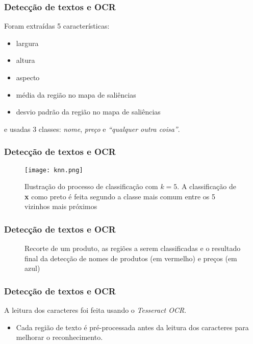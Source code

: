 \documentclass{beamer}
\begin{document}
\begin{frame}
\frametitle{Detecção de textos e OCR}
        
    Foram extraídas 5 características:\pause
    \begin{itemize}
        \item largura\pause
        \item altura\pause
        \item aspecto\pause
        \item média da região no mapa de saliências\pause
        \item desvio padrão da região no mapa de saliências
    \end{itemize}\pause
     e usadas 3 classes: \emph{nome}, \emph{preço} e \emph{``qualquer outra coisa''}.
\end{frame}

\begin{frame}
\frametitle{Detecção de textos e OCR}
\begin{figure}[h!]
    \begin{center}
        \texttt{[image: knn.png]}
        \caption{Ilustração do processo de classificação com $k=5$. A classificação de {\bf x} como preto é feita segundo a classe mais comum entre os 5 vizinhos mais próximos \label{fig:knn}}
    \end{center}
\end{figure}
\end{frame}

\begin{frame}
\frametitle{Detecção de textos e OCR}
    \begin{figure}[!h]
            \caption{Recorte de um produto, as regiões a serem classificadas e o resultado final da detecção de nomes de produtos (em vermelho) e preços (em azul)}
    \end{figure}
\end{frame}

\begin{frame}
\frametitle{Detecção de textos e OCR}
    A leitura dos caracteres foi feita usando o \emph{Tesseract OCR}.  \pause
    \begin{itemize} \item Cada região de texto é pré-processada antes da leitura dos caracteres para melhorar o reconhecimento. \end{itemize}

\end{frame}
\end{document}
